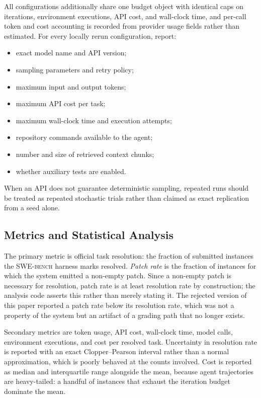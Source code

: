 \documentclass[journal]{IEEEtran}
\newcommand{\swebench}{\textsc{SWE-bench}}
\begin{document}
All configurations additionally share one budget object with identical caps on iterations, environment executions, API cost, and wall-clock time, and per-call token and cost accounting is recorded from provider usage fields rather than estimated. For every locally rerun configuration, report:
\begin{itemize}
    \item exact model name and API version;
    \item sampling parameters and retry policy;
    \item maximum input and output tokens;
    \item maximum API cost per task;
    \item maximum wall-clock time and execution attempts;
    \item repository commands available to the agent;
    \item number and size of retrieved context chunks;
    \item whether auxiliary tests are enabled.
\end{itemize}
When an API does not guarantee deterministic sampling, repeated runs should be treated as repeated stochastic trials rather than claimed as exact replication from a seed alone.

\subsection{Metrics and Statistical Analysis}

The primary metric is official task resolution: the fraction of submitted instances the \swebench{} harness marks resolved. \emph{Patch rate} is the fraction of instances for which the system emitted a non-empty patch. Since a non-empty patch is necessary for resolution, patch rate is at least resolution rate by construction; the analysis code asserts this rather than merely stating it. The rejected version of this paper reported a patch rate below its resolution rate, which was not a property of the system but an artifact of a grading path that no longer exists.

Secondary metrics are token usage, API cost, wall-clock time, model calls, environment executions, and cost per resolved task. Uncertainty in resolution rate is reported with an exact Clopper--Pearson interval rather than a normal approximation, which is poorly behaved at the counts involved. Cost is reported as median and interquartile range alongside the mean, because agent trajectories are heavy-tailed: a handful of instances that exhaust the iteration budget dominate the mean.
\end{document}
